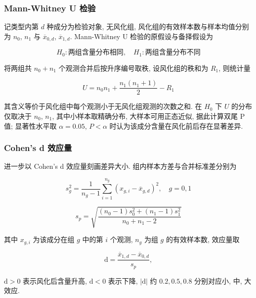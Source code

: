 \documentclass{ctexart}
\begin{document}
\subsubsection{Mann-Whitney U 检验}

记类型内第 $d$ 种成分为检验对象, 无风化组, 风化组的有效样本数与样本均值分别为 $n_{0}$, $n_{1}$ 与 $\overline{x}_{0,d}$, $\overline{x}_{1,d}$. Mann-Whitney U 检验的原假设与备择假设为

\begin{equation*}
H_{0}:\text{两组含量分布相同},\quad{H}_{1}:\text{两组含量分布不同}
\end{equation*}

将两组共 $n_{0}+n_{1}$ 个观测合并后按升序编号取秩, 设风化组的秩和为 $R_{1}$, 则统计量

\begin{equation*}
U=n_{0}n_{1}+\frac{n_{1}\left(n_{1}+1\right)}{2}-R_{1}
\end{equation*}

其含义等价于风化组中每个观测小于无风化组观测的次数之和. 在 $H_0$ 下 $U$ 的分布仅取决于 $n_{0}$, $n_{1}$, 其中小样本取精确分布, 大样本可用正态近似, 据此计算双尾 P 值; 显著性水平取 $\alpha=0.05$, $P<\alpha$ 时认为该成分含量在风化前后存在显著差异.


\subsubsection{Cohen's d 效应量}

进一步以 Cohen's d 效应量刻画差异大小. 组内样本方差与合并标准差分别为

\begin{equation*}
s_{g}^{2}=\frac{1}{n_{g}-1}\sum_{i=1}^{n_{g}}\left(x_{g,i}-\overline{x}_{g,d}\right)^{2},\quad{g}=0,1
\end{equation*}

\begin{equation*}
s_{p}=\sqrt{\frac{\left(n_{0}-1\right)s_{0}^{2}+\left(n_{1}-1\right)s_{1}^{2}}{n_{0}+n_{1}-2}}
\end{equation*}

其中 $x_{g,i}$ 为该成分在组 $g$ 中的第 $i$ 个观测, $n_g$ 为组 $g$ 的有效样本数, 效应量取

\begin{equation*}
\mathrm{d}=\frac{\overline{x}_{1,d}-\overline{x}_{0,d}}{s_{p}},
\end{equation*}

$\mathrm{d}>0$ 表示风化后含量升高, $\mathrm{d}<0$ 表示下降, $\left|\mathrm{d}\right|$ 约 $0.2,0.5,0.8$ 分别对应小, 中, 大效应.
\end{document}
